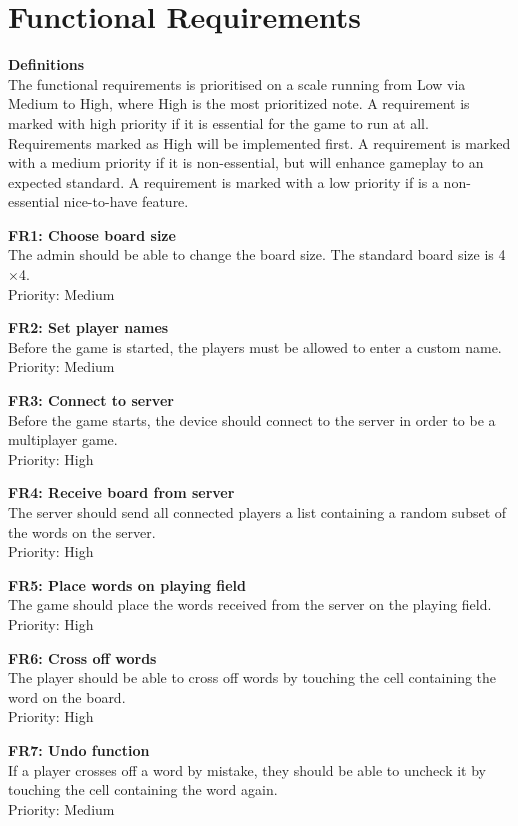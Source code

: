 \section{Functional Requirements} 
\label{sec:functional requirements}

{\bf Definitions}\\
The functional requirements is prioritised on a scale running from Low via Medium to High, where High is the most prioritized note. 
A requirement is marked with high priority if it is essential for the game to run at all. Requirements marked as High will be implemented first.
A requirement is marked with a medium priority if it is non-essential, but will enhance gameplay to an expected standard. 
A requirement is marked with a low priority if is a non-essential nice-to-have feature.

{\bf FR1: Choose board size}\\
The admin should be able to change the board size. The standard board size is
4$\times$4.\\
Priority: Medium

{\bf FR2: Set player names}\\
Before the game is started, the players must be allowed to enter a custom
name.\\
Priority: Medium

{\bf FR3: Connect to server}\\
Before the game starts, the device should connect to the server in order to be
a multiplayer game.\\
Priority: High

{\bf FR4: Receive board from server}\\
The server should send all connected players a list containing a random
subset of the words on the server.\\
Priority: High

{\bf FR5: Place words on playing field}\\
The game should place the words received from the server on the playing
field.\\
Priority: High

{\bf FR6: Cross off words}\\
The player should be able to cross off words by touching the cell containing
the word on the board.\\
Priority: High

{\bf FR7: Undo function}\\
If a player crosses off a word by mistake, they should be able to uncheck it by
touching the cell containing the word again.\\
Priority: Medium

